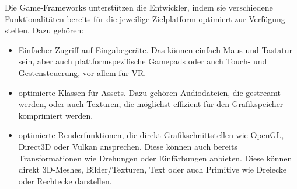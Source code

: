 Die Game-Frameworks unterstützen die Entwickler, indem sie verschiedene Funktionalitäten bereits für die jeweilige Zielplatform optimiert zur Verfügung stellen. Dazu gehören:

\begin{itemize}
\item Einfacher Zugriff auf Eingabegeräte. Das können einfach Maus und Tastatur sein, aber auch plattformspezifische Gamepads oder auch Touch- und Gestensteuerung, vor allem für VR.\\
\item optimierte Klassen für Assets. Dazu gehören Audiodateien, die gestreamt werden, oder auch Texturen, die möglichst effizient für den Grafikspeicher komprimiert werden.\\
\item optimierte Renderfunktionen, die direkt Grafikschnittstellen wie OpenGL, Direct3D oder Vulkan ansprechen. Diese können auch bereits Transformationen wie Drehungen oder Einfärbungen anbieten. Diese können direkt 3D-Meshes, Bilder/Texturen, Text oder auch Primitive wie Dreiecke oder Rechtecke darstellen.\\
\end{itemize}

